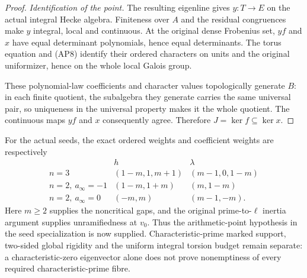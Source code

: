 \begin{proof}
\emph{Identification of the point.}
The resulting eigenline gives \(y:T\to E\) on the actual integral
Hecke algebra.  Finiteness over \(A\) and the residual congruences make
\(y\) integral, local and continuous.  At the original dense Frobenius
set, \(yf\) and \(x\) have equal determinant polynomials, hence equal
determinants.  The torus equation and \textup{(AP8)} identify their
ordered characters on units and the original uniformizer, hence on
the whole local Galois group.

These polynomial-law coefficients and character values topologically
generate \(B\): in each finite quotient, the subalgebra they generate
carries the same universal pair, so uniqueness in the universal
property makes it the whole quotient.  The continuous maps \(yf\)
and \(x\) consequently agree.  Therefore \(J=\ker f\subseteq\ker x\).
\end{proof}

For the actual seeds, the exact ordered weights and coefficient weights
are respectively
\[
\begin{array}{c|c|c}
 & h & \lambda\\ \hline
 n=3 &(1-m,1,m+1)&(m-1,0,1-m)\\
 n=2,\ a_\infty=-1 &(1-m,1+m)&(m,1-m)\\
 n=2,\ a_\infty=0 &(-m,m)&(m-1,-m).
\end{array}
\]
Here \(m\geq2\) supplies the noncritical gaps, and the original
prime-to-\(\ell\) inertia argument supplies unramifiedness at \(v_0\).
Thus the arithmetic-point hypothesis in the seed specialization is
now supplied.  Characteristic-prime marked support, two-sided global
rigidity and the uniform integral torsion budget remain separate:
a characteristic-zero eigenvector alone does not prove nonemptiness
of every required characteristic-prime fibre.
